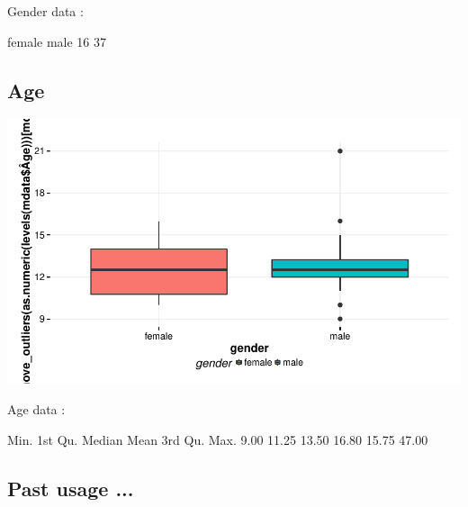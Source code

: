 \documentclass{article}
\begin{document}
Gender data : 
\begin{Schunk}
\begin{Soutput}
female   male 
    16     37 
\end{Soutput}
\end{Schunk}

\subsection{Age}
\includegraphics{Raw_num/plots/-plot_gender_age}

Age data : 
\begin{Schunk}
\begin{Soutput}
   Min. 1st Qu.  Median    Mean 3rd Qu.    Max. 
   9.00   11.25   13.50   16.80   15.75   47.00 
\end{Soutput}
\end{Schunk}

\subsection{Past usage ...}
\end{document}
